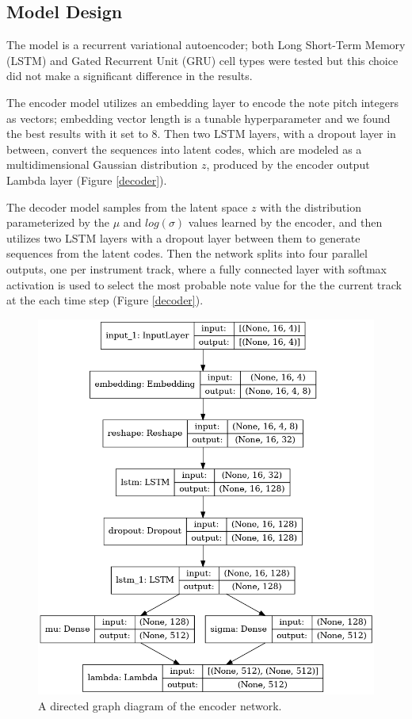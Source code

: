 \documentclass[sigconf,authorversion]{acmart}
\begin{document}
\subsection{Model Design}

The model is a recurrent variational autoencoder; both Long Short-Term
Memory (LSTM) and Gated Recurrent Unit (GRU) cell types were tested
but this choice did not make a significant difference in the results.

The encoder model utilizes an embedding layer to encode the note pitch
integers as vectors; embedding vector length is a tunable
hyperparameter and we found the best results with it set to 8. Then
two LSTM layers, with a dropout layer in between, convert the
sequences into latent codes, which are modeled as a multidimensional
Gaussian distribution $z$, produced by the encoder output Lambda layer
(Figure \ref{decoder}).

The decoder model samples from the latent space $z$ with the
distribution parameterized by the $\mu$ and $log(\sigma)$ values
learned by the encoder, and then utilizes two LSTM layers with a
dropout layer between them to generate sequences from the latent
codes. Then the network splits into four parallel outputs, one per
instrument track, where a fully connected layer with softmax
activation is used to select the most probable note value for the
the current track at the each time step (Figure \ref{decoder}).

\begin{figure}[h]
  \centering
  \includegraphics[width=\linewidth]{figures/encoder.png}
  \caption{A directed graph diagram of the encoder network.}
  \label{encoder}
\end{figure}
\end{document}
